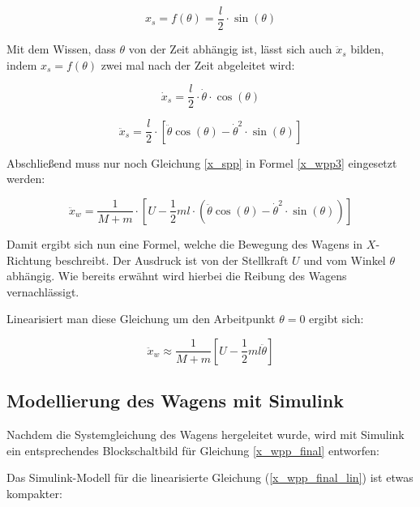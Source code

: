 \begin{equation}
x_s = f(\theta) = \frac{l}{2} \cdot \sin(\theta)
\label{x_s}
\end{equation}

Mit dem Wissen, dass $\theta$ von der Zeit abhängig ist, lässt sich auch $\ddot{x}_s$ bilden, indem $x_s=f(\theta)$ zwei mal nach der Zeit abgeleitet wird:

\begin{equation}
\dot{x}_s=\frac{l}{2} \cdot \dot{\theta} \cdot \cos(\theta)
\label{x_sp}
\end{equation}

\begin{equation}
\ddot{x}_s=\frac{l}{2} \cdot [\ddot{\theta}\cos(\theta) - \dot{\theta}^2\cdot \sin(\theta)]
\label{x_spp}
\end{equation}

Abschließend muss nur noch Gleichung \ref{x_spp} in Formel \ref{x_wpp3} eingesetzt werden:

\begin{equation}
\ddot{x}_w=\frac{1}{M+m} \cdot [U-\frac{1}{2}ml \cdot (\ddot{\theta}\cos(\theta)-\dot{\theta}^2\cdot\sin(\theta))]
\label{x_wpp_final}
\end{equation}

Damit ergibt sich nun eine Formel, welche die Bewegung des Wagens in $X$-Richtung beschreibt. Der Ausdruck ist von der Stellkraft $U$ und vom Winkel $\theta$ abhängig. Wie bereits erwähnt wird hierbei die Reibung des Wagens vernachlässigt.

Linearisiert man diese Gleichung um den Arbeitpunkt $\theta=0$ ergibt sich:

\begin{equation}
\ddot{x}_w \approx \frac{1}{M+m}[U-\frac{1}{2}ml\ddot{\theta}]
\label{x_wpp_final_lin}
\end{equation}



\clearpage
\subsection{Modellierung des Wagens mit Simulink}%
Nachdem die Systemgleichung des Wagens hergeleitet wurde, wird mit Simulink ein entsprechendes Blockschaltbild für Gleichung \ref{x_wpp_final} entworfen:


Das Simulink-Modell für die linearisierte Gleichung (\ref{x_wpp_final_lin}) ist etwas kompakter:


